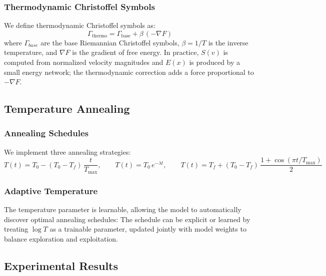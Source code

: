\documentclass{article}
\numberwithin{equation}{section}
\begin{document}
\subsubsection{Thermodynamic Christoffel Symbols}
We define thermodynamic Christoffel symbols as:
\[
\Gamma_{\text{thermo}} = \Gamma_{\text{base}} + \beta\,(-\nabla F)
\]
where $\Gamma_{base}$ are the base Riemannian Christoffel symbols, $\beta = 1/T$ is the inverse temperature, and $\nabla F$ is the gradient of free energy.
In practice, $S(v)$ is computed from normalized velocity magnitudes and $E(x)$ is produced by a small energy network; the thermodynamic correction adds a force proportional to $-\nabla F$.

\subsection{Temperature Annealing}
\subsubsection{Annealing Schedules}
We implement three annealing strategies:
\[
T(t) = T_0 - (T_0 - T_f)\,\frac{t}{T_{\max}},\qquad
T(t) = T_0\,e^{-\lambda t},\qquad
T(t) = T_f + (T_0 - T_f)\,\frac{1+\cos(\pi t/T_{\max})}{2}
\]

\subsubsection{Adaptive Temperature}
The temperature parameter is learnable, allowing the model to automatically discover optimal annealing schedules:
The schedule can be explicit or learned by treating $\log T$ as a trainable parameter, updated jointly with model weights to balance exploration and exploitation.

\subsection{Experimental Results}
\end{document}

